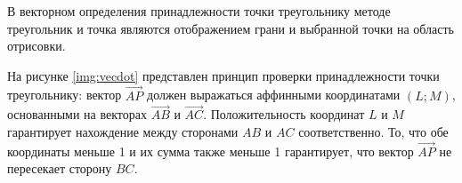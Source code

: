 В векторном определения принадлежности точки треугольнику методе треугольник и точка являются отображением грани и выбранной точки на область отрисовки. 


\FloatBarrier

На рисунке \ref{img:vecdot} представлен принцип проверки принадлежности точки треугольнику: вектор $\overrightarrow{AP}$ должен выражаться аффинными координатами $(L; M)$, основанными на векторах $\overrightarrow{AB}$ и $\overrightarrow{AC}$. Положительность координат $L$ и $M$ гарантирует нахождение между сторонами $AB$ и $AC$ соответственно. То, что обе координаты меньше 1 и их сумма также меньше 1 гарантирует, что вектор $\overrightarrow{AP}$ не пересекает сторону $BC$.